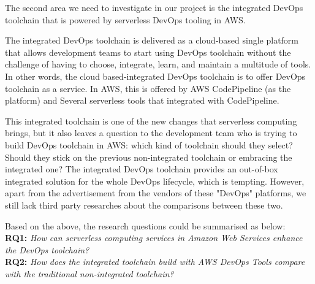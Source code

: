 \par
The second area we need to investigate in our project is the integrated DevOps toolchain that is powered by serverless DevOps tooling in AWS. 
\par
The integrated DevOps toolchain is delivered as a cloud-based single platform that allows development teams to start using DevOps toolchain without the challenge of having to choose, integrate, learn, and maintain a multitude of tools. In other words, the cloud based-integrated DevOps toolchain is to offer DevOps toolchain as a service.
In AWS, this is offered by AWS CodePipeline (as the platform) and Several serverless tools that integrated with CodePipeline.
\par
This integrated toolchain is one of the new changes that serverless computing brings, but it also leaves a question to the development team who is trying to build DevOps toolchain in AWS: which kind of toolchain should they select? Should they stick on the previous non-integrated toolchain or embracing the integrated one? The integrated DevOps toolchain provides an out-of-box integrated solution for the whole DevOps lifecycle, which is tempting. However, apart from the advertisement from the vendors of these "DevOps" platforms, we still lack third party researches about the comparisons between these two. 
\par
Based on the above, the research questions could be summarised as below: \\
\textbf{RQ1:} \textit{How can serverless computing services in Amazon Web Services enhance the DevOps toolchain?} \\
\textbf{RQ2:} \textit{How does the integrated toolchain build with AWS DevOps Tools compare with the traditional non-integrated toolchain?}
